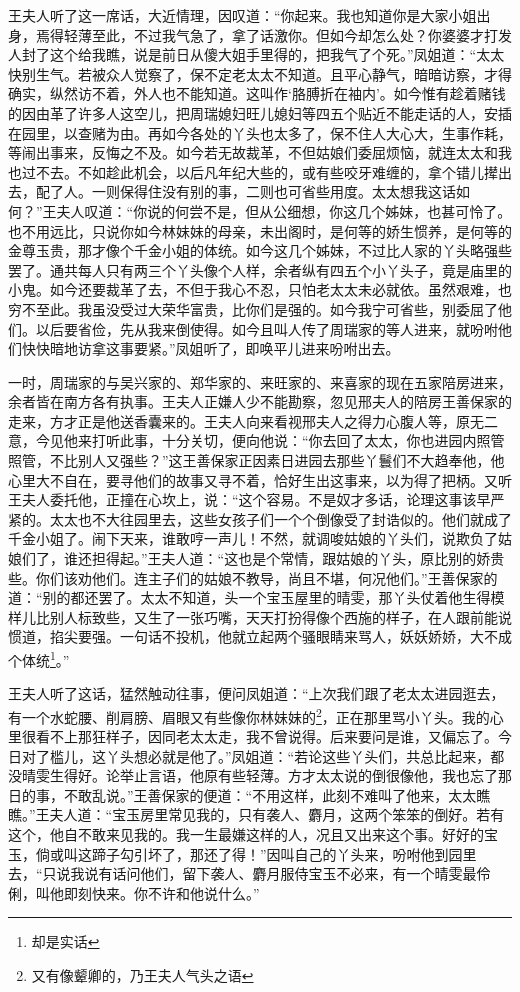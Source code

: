 \documentclass[12pt,oneside]{book}
\begin{document}
王夫人听了这一席话，大近情理，因叹道：“你起来。我也知道你是大家小姐出身，焉得轻薄至此，不过我气急了，拿了话激你。但如今却怎么处？你婆婆才打发人封了这个给我瞧，说是前日从傻大姐手里得的，把我气了个死。”凤姐道：“太太快别生气。若被众人觉察了，保不定老太太不知道。且平心静气，暗暗访察，才得确实，纵然访不着，外人也不能知道。这叫作‘胳膊折在袖内’。如今惟有趁着赌钱的因由革了许多人这空儿，把周瑞媳妇旺儿媳妇等四五个贴近不能走话的人，安插在园里，以查赌为由。再如今各处的丫头也太多了，保不住人大心大，生事作耗，等闹出事来，反悔之不及。如今若无故裁革，不但姑娘们委屈烦恼，就连太太和我也过不去。不如趁此机会，以后凡年纪大些的，或有些咬牙难缠的，拿个错儿撵出去，配了人。一则保得住没有别的事，二则也可省些用度。太太想我这话如何？”王夫人叹道：“你说的何尝不是，但从公细想，你这几个姊妹，也甚可怜了。也不用远比，只说你如今林妹妹的母亲，未出阁时，是何等的娇生惯养，是何等的金尊玉贵，那才像个千金小姐的体统。如今这几个姊妹，不过比人家的丫头略强些罢了。通共每人只有两三个丫头像个人样，余者纵有四五个小丫头子，竟是庙里的小鬼。如今还要裁革了去，不但于我心不忍，只怕老太太未必就依。虽然艰难，也穷不至此。我虽没受过大荣华富贵，比你们是强的。如今我宁可省些，别委屈了他们。以后要省俭，先从我来倒使得。如今且叫人传了周瑞家的等人进来，就吩咐他们快快暗地访拿这事要紧。”凤姐听了，即唤平儿进来吩咐出去。

一时，周瑞家的与吴兴家的、郑华家的、来旺家的、来喜家的现在五家陪房进来，余者皆在南方各有执事。王夫人正嫌人少不能勘察，忽见邢夫人的陪房王善保家的走来，方才正是他送香囊来的。王夫人向来看视邢夫人之得力心腹人等，原无二意，今见他来打听此事，十分关切，便向他说：“你去回了太太，你也进园内照管照管，不比别人又强些？”这王善保家正因素日进园去那些丫鬟们不大趋奉他，他心里大不自在，要寻他们的故事又寻不着，恰好生出这事来，以为得了把柄。又听王夫人委托他，正撞在心坎上，说：“这个容易。不是奴才多话，论理这事该早严紧的。太太也不大往园里去，这些女孩子们一个个倒像受了封诰似的。他们就成了千金小姐了。闹下天来，谁敢哼一声儿！不然，就调唆姑娘的丫头们，说欺负了姑娘们了，谁还担得起。”王夫人道：“这也是个常情，跟姑娘的丫头，原比别的娇贵些。你们该劝他们。连主子们的姑娘不教导，尚且不堪，何况他们。”王善保家的道：“别的都还罢了。太太不知道，头一个宝玉屋里的晴雯，那丫头仗着他生得模样儿比别人标致些，又生了一张巧嘴，天天打扮得像个西施的样子，在人跟前能说惯道，掐尖要强。一句话不投机，他就立起两个骚眼睛来骂人，妖妖娇娇，大不成个体统\footnote{却是实话}。”

王夫人听了这话，猛然触动往事，便问凤姐道：“上次我们跟了老太太进园逛去，有一个水蛇腰、削肩膀、眉眼又有些像你林妹妹的\footnote{又有像颦卿的，乃王夫人气头之语}，正在那里骂小丫头。我的心里很看不上那狂样子，因同老太太走，我不曾说得。后来要问是谁，又偏忘了。今日对了槛儿，这丫头想必就是他了。”凤姐道：“若论这些丫头们，共总比起来，都没晴雯生得好。论举止言语，他原有些轻薄。方才太太说的倒很像他，我也忘了那日的事，不敢乱说。”王善保家的便道：“不用这样，此刻不难叫了他来，太太瞧瞧。”王夫人道：“宝玉房里常见我的，只有袭人、麝月，这两个笨笨的倒好。若有这个，他自不敢来见我的。我一生最嫌这样的人，况且又出来这个事。好好的宝玉，倘或叫这蹄子勾引坏了，那还了得！”因叫自己的丫头来，吩咐他到园里去，“只说我说有话问他们，留下袭人、麝月服侍宝玉不必来，有一个晴雯最伶俐，叫他即刻快来。你不许和他说什么。”
\end{document}
